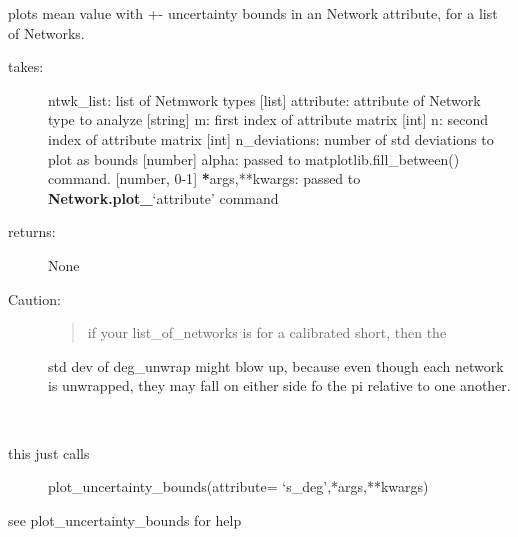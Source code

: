\documentclass[letterpaper,10pt,english]{sphinxmanual}
\begin{document}

\begin{fulllineitems}
\label{api/mwavepy:mwavepy.network.plot_uncertainty_bounds}
plots mean value with +- uncertainty bounds in an Network attribute,
for a list of Networks.
\begin{description}
\item[{takes:}] \leavevmode
ntwk\_list: list of Netmwork types {[}list{]}
attribute: attribute of Network type to analyze {[}string{]} 
m: first index of attribute matrix {[}int{]}
n: second index of attribute matrix {[}int{]}
n\_deviations: number of std deviations to plot as bounds {[}number{]}
alpha: passed to matplotlib.fill\_between() command. {[}number, 0-1{]}
{\color{red}\bfseries{}*}args,**kwargs: passed to {\color{red}\bfseries{}Network.plot\_}`attribute' command

\item[{returns:}] \leavevmode
None

\item[{Caution:}] \leavevmode\begin{quote}

if your list\_of\_networks is for a calibrated short, then the
\end{quote}

std dev of deg\_unwrap might blow up, because even though each
network is unwrapped, they may fall on either side fo the pi 
relative to one another.

\end{description}

\end{fulllineitems}


\begin{fulllineitems}
\label{api/mwavepy:mwavepy.network.plot_uncertainty_bounds_s_deg}~\begin{description}
\item[{this just calls }] \leavevmode
plot\_uncertainty\_bounds(attribute= `s\_deg',*args,**kwargs)

\end{description}

see plot\_uncertainty\_bounds for help

\end{fulllineitems}
\end{document}

